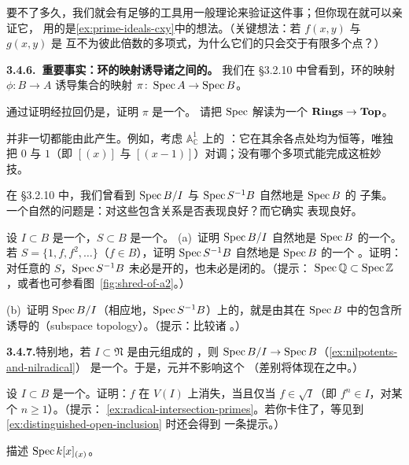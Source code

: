 要不了多久，我们就会有足够的工具用一般理论来验证这件事；但你现在就可以亲证它，
用的是\cref{ex:prime-ideals-cxy}中的想法。（关键想法：若 $f(x,y)$ 与 $g(x,y)$ 是
互不为彼此倍数的\trIrreducible{}多项式，为什么它们的\trZeroSet{}只会交于有限多个点？）

\textbf{3.4.6.\ 重要事实：环的映射诱导诸\trTopologicalSpace{}之间的\trContinuousMap。}\quad
我们在 \S3.2.10 中曾看到，环的映射 $\phi\colon B\to A$ 诱导集合的映射
$\pi\colon\operatorname{Spec} A\to\operatorname{Spec} B$。

\begin{exercise}[重要而容易的练习]\label{ex:ring-maps-continuous-maps}
通过证明\trClosedSet{}经拉回仍是\trClosedSet，证明 $\pi$ 是一个\trContinuousMap。
请把 $\operatorname{Spec}$ 解读为一个\trContravariantFunctor{} $\mathbf{Rings}\to\mathbf{Top}$。
\end{exercise}

并非一切\trContinuousMap{}都能由此产生。例如，考虑 $\mathbb{A}^1_{\mathbb{C}}$ 上的%
\trContinuousMap：它在其余各点处均为恒等，唯独把 $0$ 与 $1$（即 $[(x)]$ 与
$[(x-1)]$）对调；没有哪个多项式能完成这桩妙技。

在 \S3.2.10 中，我们曾看到 $\operatorname{Spec} B/I$ 与 $\operatorname{Spec} S^{-1}B$ 自然地是 $\operatorname{Spec} B$ 的
子集。一个自然的问题是：\trZariskiTopology{}对这些包含关系是否表现良好？而它确实
表现良好。

\begin{exercise}
\label{ex:subspace-topology-inclusions}
设 $I\subset B$ 是一个\trIdeal，$S\subset B$ 是一个\trMultiplicativeSubset。
(a)~证明 $\operatorname{Spec} B/I$ 自然地是 $\operatorname{Spec} B$ 的一个\trClosedSubset。若
$S=\{1,f,f^2,\dots\}$（$f\in B$），证明 $\operatorname{Spec} S^{-1}B$ 自然地是 $\operatorname{Spec} B$ 的一个%
\trOpenSubset。证明：对任意的 $S$，$\operatorname{Spec} S^{-1}B$ 未必是开的，也未必是闭的。（提示：
$\operatorname{Spec}\mathbb{Q}\subset\operatorname{Spec}\mathbb{Z}$，或者也可参看图~\ref{fig:shred-of-a2}。）

(b)~证明 $\operatorname{Spec} B/I$（相应地，$\operatorname{Spec} S^{-1}B$）上的\trZariskiTopology，就是由其在
$\operatorname{Spec} B$ 中的包含所诱导的\trSubspaceTopology{}（subspace topology）。（提示：比较诸%
\trClosedSubset。）
\end{exercise}

\textbf{3.4.7.}\quad 特别地，若 $I\subset\mathfrak{N}$ 是由\trNilpotent{}元组成的%
\trIdeal，则\trBijection{} $\operatorname{Spec} B/I\to\operatorname{Spec} B$（\cref{ex:nilpotents-and-nilradical}）
是一个\trHomeomorphism。于是，\trNilpotent{}元并不影响这个\trTopologicalSpace
（差别将体现在\trStructureSheaf{}之中。）

\begin{exercise}[日后有用的练习]\label{ex:vanish-on-vi-radical}
设 $I\subset B$ 是一个\trIdeal。证明：$f$ 在 $V(I)$ 上消失，当且仅当
$f\in\sqrt{I}$（即 $f^n\in I$，对某个 $n\ge 1$）。（提示：%
\cref{ex:radical-intersection-primes}。若你卡住了，等见到\cref{ex:distinguished-open-inclusion} 时还会得到
一条提示。）
\end{exercise}

\begin{exercise}
\label{ex:topological-space-kx-p}
描述\trTopologicalSpace{} $\operatorname{Spec} k[x]_{(x)}$。
\end{exercise}
